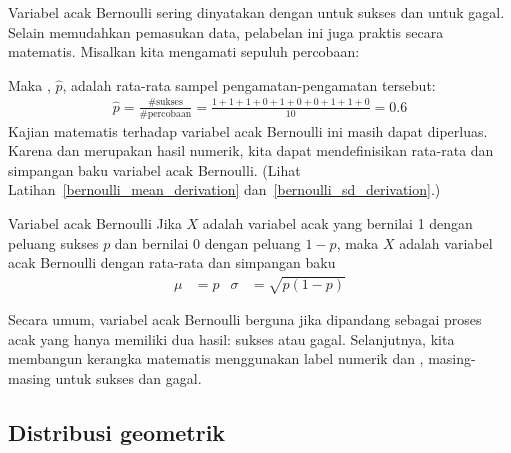 Variabel acak Bernoulli sering dinyatakan dengan  untuk sukses
dan  untuk gagal. Selain memudahkan pemasukan data, pelabelan ini
juga praktis secara matematis. Misalkan kita mengamati sepuluh percobaan:
\begin{center}
         
\end{center}
Maka , $\hat{p}$, adalah
rata-rata sampel pengamatan-pengamatan tersebut:
\begin{align*}
\hat{p} = \frac{\text{\# sukses}}{\text{\# percobaan}}
    = \frac{1+1+1+0+1+0+0+1+1+0}{10} = 0.6
\end{align*}%
Kajian matematis terhadap variabel acak Bernoulli ini masih dapat
diperluas.
Karena  dan  merupakan hasil numerik, kita dapat
mendefinisikan {rata-rata} dan {simpangan baku} variabel acak Bernoulli.
(Lihat Latihan~\ref{bernoulli_mean_derivation}
dan~\ref{bernoulli_sd_derivation}.)

\begin{onebox}{Variabel acak Bernoulli}
  Jika $X$ adalah variabel acak yang bernilai 1 dengan
  peluang sukses $p$ dan bernilai 0 dengan peluang $1-p$,
  maka $X$ adalah variabel acak Bernoulli dengan rata-rata
  dan simpangan baku
  \begin{align*}
  \mu &= p
      &\sigma&= \sqrt{p(1-p)}
  \end{align*}
\end{onebox}

Secara umum, variabel acak Bernoulli berguna jika dipandang sebagai proses
acak yang hanya memiliki dua hasil: sukses atau gagal. Selanjutnya, kita
membangun kerangka matematis menggunakan label numerik  dan
, masing-masing untuk sukses dan gagal.



\D{\newpage}

\subsection{Distribusi geometrik}


